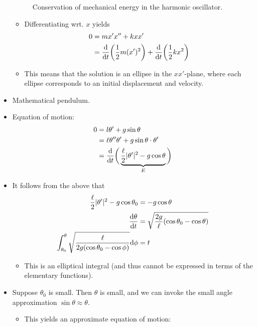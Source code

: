 \documentclass[../notes.tex]{subfiles}
\begin{document}
\begin{itemize}
\begin{figure}[h!]
        \caption{Conservation of mechanical energy in the harmonic oscillator.}
        \label{fig:harmonicEConservation}
    \end{figure}
    \begin{itemize}
        \item Differentiating wrt. $x$ yields
        \begin{align*}
            0 &= mx'x''+kxx'\\
            &= \dv{t}(\frac{1}{2}m(x')^2)+\dv{t}(\frac{1}{2}kx^2)
        \end{align*}
        \item This means that the solution is an ellipse in the $xx'$-plane, where each ellipse corresponds to an initial displacement and velocity.
    \end{itemize}
    \item Mathematical pendulum.
    \item Equation of motion:
    \begin{align*}
        0 &= l\theta'+g\sin\theta\\
        &= \ell\theta''\theta'+g\sin\theta\cdot\theta'\\
        &= \dv{t}\bigg( \underbrace{\frac{\ell}{2}|\theta'|^2-g\cos\theta}_E \bigg)
    \end{align*}
    \item It follows from the above that
    \begin{align*}
        \frac{\ell}{2}|\theta'|^2-g\cos\theta_0 &= -g\cos\theta\\
        \dv{\theta}{t} &= \sqrt{\frac{2g}{\ell}(\cos\theta_0-\cos\theta)}\\
        \int_{\theta_0}^\theta\sqrt{\frac{\ell}{2g(\cos\theta_0-\cos\phi)}}\dd\phi &= t
    \end{align*}
    \begin{itemize}
        \item This is an elliptical integral (and thus cannot be expressed in terms of the elementary functions).
    \end{itemize}
    \item Suppose $\theta_0$ is small. Then $\theta$ is small, and we can invoke the small angle approximation $\sin\theta\approx\theta$.
    \begin{itemize}
        \item This yields an approximate equation of motion:

\end{itemize}
\end{itemize}
\end{document}
